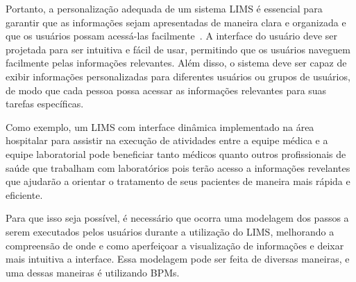 Portanto, a personalização adequada de um sistema LIMS é essencial para garantir que as informações sejam apresentadas de maneira clara e organizada e que os usuários possam acessá-las facilmente~\cite{Tomlinson2022AOperations}. A interface do usuário deve ser projetada para ser intuitiva e fácil de usar, permitindo que os usuários naveguem facilmente pelas informações relevantes. Além disso, o sistema deve ser capaz de exibir informações personalizadas para diferentes usuários ou grupos de usuários, de modo que cada pessoa possa acessar as informações relevantes para suas tarefas específicas.


Como exemplo, um LIMS com interface dinâmica implementado na área hospitalar para assistir na execução de atividades entre a equipe médica e a equipe laboratorial pode beneficiar tanto médicos quanto outros profissionais de saúde que trabalham com laboratórios pois terão acesso a informações revelantes que ajudarão a orientar o tratamento de seus pacientes de maneira mais rápida e eficiente.

Para que isso seja possível, é necessário que ocorra uma modelagem dos passos a serem executados pelos usuários durante a utilização do LIMS, melhorando a compreensão de onde e como aperfeiçoar a visualização de informações e deixar mais intuitiva a interface. Essa modelagem pode ser feita de diversas maneiras, e uma dessas maneiras é utilizando BPMs.